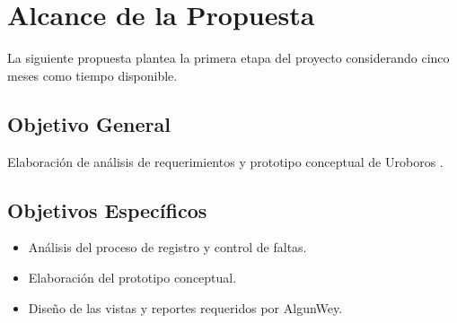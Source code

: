 \documentclass[10pt]{book}
\newcommand{\nombreProyecto}{Uroboros }
\newcommand{\cliente}{AlgunWey}
\begin{document}
\chapter{Alcance de la Propuesta}

	La siguiente propuesta plantea la primera etapa del proyecto considerando cinco meses como tiempo disponible.

\section{Objetivo General}

	Elaboración de análisis de requerimientos y prototipo conceptual de \nombreProyecto.
\section{Objetivos Específicos}

\begin{itemize}
	\item Análisis del proceso de registro y control de faltas.
	\item Elaboración del prototipo conceptual.
	\item Diseño de las vistas y reportes requeridos por \cliente.
\end{itemize}

%
%
%
%

	
\end{document}
